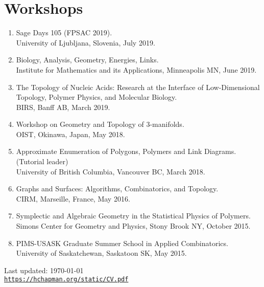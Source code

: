 \documentclass[letterpaper]{article}
\def\footerlink{https://hchapman.org/static/CV.pdf}
\begin{document}
\section*{Workshops}
\begin{enumerate}
\item Sage Days 105 (FPSAC 2019). \\
  University of Ljubljana, Slovenia, July 2019.
\item Biology, Analysis, Geometry, Energies, Links. \\
  Institute for Mathematics and its Applications, Minneapolis MN, June 2019.
\item The Topology of Nucleic Acids: Research at the Interface of Low-Dimensional Topology, Polymer Physics, and Molecular Biology. \\
  BIRS, Banff AB, March 2019.
\item Workshop on Geometry and Topology of 3-manifolds. \\
  OIST, Okinawa, Japan, May 2018.
\item Approximate Enumeration of Polygons, Polymers and Link Diagrams. (Tutorial leader) \\
  University of British Columbia, Vancouver BC, March 2018.
\item Graphs and Surfaces: Algorithms, Combinatorics, and Topology. \\
  CIRM, Marseille, France, May 2016.
\item Symplectic and Algebraic Geometry in the Statistical Physics of Polymers. \\
  Simons Center for Geometry and Physics, Stony Brook NY, October 2015. 
\item PIMS-USASK Graduate Summer School in Applied Combinatorics. \\
  University of Saskatchewan, Saskatoon SK, May 2015.
\end{enumerate}

\bigskip

\begin{center}
  \begin{footnotesize}
    Last updated: \today \\
    \href{\footerlink}{\texttt{\footerlink}}
  \end{footnotesize}
\end{center}
\end{document}
